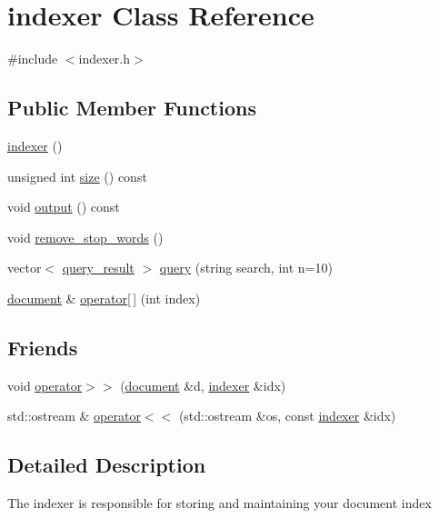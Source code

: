 \hypertarget{classindexer}{}\section{indexer Class Reference}
\label{classindexer}


{\ttfamily \#include $<$indexer.\+h$>$}

\subsection*{Public Member Functions}
\begin{DoxyCompactItemize}
\item 
\hyperlink{classindexer_acbbcbad080a7ae43ed78840fcf006960}{indexer} ()
\item 
unsigned int \hyperlink{classindexer_a227b90870b8807668485754e402b8a60}{size} () const
\item 
void \hyperlink{classindexer_af84f1ddc60859b7d007699ee011abf36}{output} () const
\item 
void \hyperlink{classindexer_afdaec83c53cbc4df71436a4c936a2e89}{remove\+\_\+stop\+\_\+words} ()
\item 
vector$<$ \hyperlink{classquery__result}{query\+\_\+result} $>$ \hyperlink{classindexer_ae72394af5bf9eb84cf2b245f19d8cf27}{query} (string search, int n=10)
\item 
\hyperlink{classdocument}{document} \& \hyperlink{classindexer_a1ef6a5497d341fdbbae13bb26a66c37a}{operator\mbox{[}$\,$\mbox{]}} (int index)
\end{DoxyCompactItemize}
\subsection*{Friends}
\begin{DoxyCompactItemize}
\item 
void \hyperlink{classindexer_a0fe0af7a5ec91ffbe15a2a89d11fe038}{operator$>$$>$} (\hyperlink{classdocument}{document} \&d, \hyperlink{classindexer}{indexer} \&idx)
\item 
std\+::ostream \& \hyperlink{classindexer_afbe836c0f0a47dc1393416275175fadb}{operator$<$$<$} (std\+::ostream \&os, const \hyperlink{classindexer}{indexer} \&idx)
\end{DoxyCompactItemize}


\subsection{Detailed Description}
The indexer is responsible for storing and maintaining your document index 

